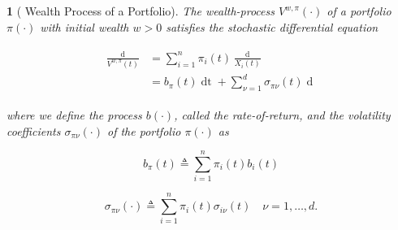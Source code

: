\documentclass[british]{amsart} \usepackage{lmodern}
\numberwithin{equation}{section} \numberwithin{figure}{section}
\theoremstyle{plain} \newtheorem{thm}{\protect\theoremname}[section]
\theoremstyle{definition} \newtheorem{defn}[thm]{\protect\definitionname}
\theoremstyle{plain} \newtheorem{assumption}[thm]{\protect\assumptionname}
\theoremstyle{plain} \newtheorem{lem}[thm]{\protect\lemmaname}
\theoremstyle{plain} \newtheorem{prop}[thm]{\protect\propositionname}
\theoremstyle{remark} \newtheorem{rem}[thm]{\protect\remarkname}
\theoremstyle{plain} \newtheorem{cor}[thm]{\protect\corollaryname}
\renewcommand{\d}[1]{\mathop{\mathrm{d}{#1}}}
\newcommand{\defeq}{\mathop{\triangleq}} \newcommand{\almostsurely}{\text{a.s.}}
\begin{document}
\begin{prop} [{\cite[Equation 2.2]{fernholz2009}} Wealth Process of a Portfolio]

  The wealth-process $V^{w,\pi}(\cdot)$ of a portfolio $\pi(\cdot)$
  with initial wealth $w > 0$ satisfies the stochastic differential equation

  \begin{gather}
    \label{eq:arithmeticreturnofportfolio}
    \begin{split}
      \frac{\d{V^{w,\pi}(t)}}{V^{w,\pi}(t)} 
        &= \sum_{i=1}^{n} \pi_{i}(t) \frac{\d{X_{i}(t)}}{X_{i}(t)} \\
        &= b_{\pi}(t)\d{t} + \sum_{\nu=1}^{d} \sigma_{\pi\nu}(t) \d{W_{\nu}(t)}
    \end{split}
  \end{gather}

  where we define the process $b(\cdot)$, called the \textit{rate-of-return}, and the
  volatility coefficients $\sigma_{\pi\nu}(\cdot)$ of the portfolio $\pi(\cdot)$ 
  as

  \begin{equation}
    \label{eq:wealthprocessrateofreturn}
    b_{\pi}(t) \defeq \sum_{i=1}^{n} \pi_{i}(t) b_{i}(t)
  \end{equation}

  \begin{equation}
    \label{eq:wealthprocessvolatility}
    \sigma_{\pi\nu}(\cdot) \defeq \sum_{i=1}^{n} \pi_{i}(t) \sigma_{i\nu}(t)
    \quad \nu=1,\dots,d.
  \end{equation}

\end{prop}
\end{document}
